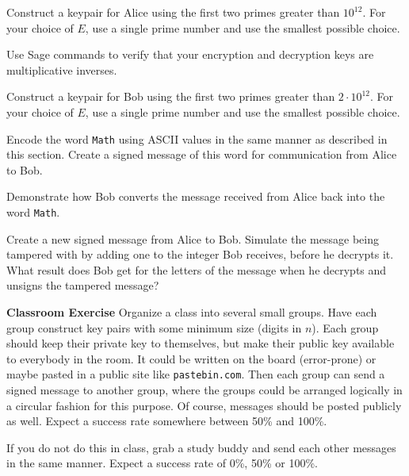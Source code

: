 \begin{sageverbatim}\end{sageverbatim}
%
%
Construct a keypair for Alice using the first two primes greater than $10^{12}$.  For your choice of $E$, use a single prime number and use the smallest possible choice.\par
%
Use Sage commands to verify that your encryption and decryption keys are multiplicative inverses.
\begin{sageverbatim}\end{sageverbatim}
%
%
%
Construct a keypair for Bob using the first two primes greater than $2\cdot 10^{12}$.  For your choice of $E$, use a single prime number and use the smallest possible choice.\par
%
Encode the word \verb?Math? using ASCII values in the same manner as described in this section.  Create a signed message of this word for communication from Alice to Bob.
\begin{sageverbatim}\end{sageverbatim}
%
%
Demonstrate how Bob converts the message received from Alice back into the word \verb?Math?.
\begin{sageverbatim}\end{sageverbatim}
%
%
Create a new signed message from Alice to Bob.  Simulate the message being tampered with by adding one to the integer Bob receives, before he decrypts it.  What result does Bob get for the letters of the message when he decrypts and unsigns the tampered message?
\begin{sageverbatim}\end{sageverbatim}
%
%
\textbf{Classroom Exercise}  Organize a class into several small groups.  Have each group construct key pairs with some minimum size (digits in $n$).  Each group should keep their private key to themselves, but make their public key available to everybody in the room.  It could be written on the board (error-prone) or maybe pasted in a public site like \texttt{pastebin.com}.  Then each group can send a signed message to another group, where the groups could be arranged logically in a circular fashion for this purpose.  Of course, messages should be posted publicly as well.  Expect a success rate somewhere between 50\% and 100\%.\par
%
If you do not do this in class, grab a study buddy and send each other messages in the same manner.  Expect a success rate of 0\%, 50\% or 100\%.
\begin{sageverbatim}\end{sageverbatim}
%

